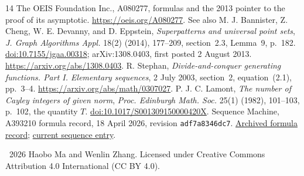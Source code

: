 \documentclass[11pt]{article}
\begin{document}
\begin{thebibliography}{14}
 The OEIS Foundation Inc., A080277,
formulas and the 2013 pointer to the proof of its asymptotic.
\url{https://oeis.org/A080277}. See also M. J. Bannister,
Z. Cheng, W. E. Devanny, and D. Eppstein,
\emph{Superpatterns and universal point sets},
\emph{J. Graph Algorithms Appl.} 18(2) (2014), 177--209,
section~2.3, Lemma~9, p.~182.
\href{https://doi.org/10.7155/jgaa.00318}{doi:10.7155/jgaa.00318};
arXiv:1308.0403, first posted 2 August 2013.
\url{https://arxiv.org/abs/1308.0403}.
 R. Stephan, \emph{Divide-and-conquer generating functions.
Part I. Elementary sequences}, 2 July 2003, section~2, equation~(2.1),
pp.~3--4. \url{https://arxiv.org/abs/math/0307027}.
 P. J. C. Lamont, \emph{The number of Cayley integers of
given norm}, \emph{Proc. Edinburgh Math. Soc.} 25(1) (1982), 101--103,
p.~102, the quantity $T$.
\href{https://doi.org/10.1017/S001309150000420X}{doi:10.1017/S001309150000420X}.
 Sequence Machine, A393210 formula record,
18 April 2026, revision \texttt{adf7a8346dc7}.
\href{https://github.com/jonmaiga/sequence-machine-data/blob/adf7a8346dc74ed9fec9462652611d740e33ec0b/oeis/A393/A393210.programs.json}{Archived formula record};
\href{https://sequencedb.net/s/A393210}{current sequence entry}.
\end{thebibliography}
\noindent\small\textcopyright\ 2026 Haobo Ma and Wenlin Zhang.
Licensed under Creative Commons Attribution 4.0 International (CC BY 4.0).
\end{document}
